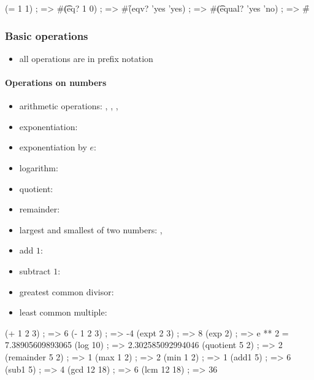 \documentclass[a4paper,landscape,10pt]{article}
\begin{document}
\begin{multicols*}{2}
  \begin{racket}
(= 1 1) ; => #\t
(eq? 1 0) ; => #\f
(eqv? 'yes 'yes) ; => #\t
(equal? 'yes 'no) ; => #\f
\end{racket}

  \subsubsection{Basic operations}

  \begin{itemize}
    \item all operations are in prefix notation 
  \end{itemize}

  \breakcolumn

  \paragraph{Operations on numbers}

  \begin{itemize}
    \item arithmetic operations: \iracket{+}, \iracket{-}, \iracket{*}, \iracket{/}
    \item exponentiation: 
    \item exponentiation by \(e\): 
    \item logarithm: 
    \item quotient: 
    \item remainder: 
    \item largest and smallest of two numbers: , 
    \item add \(1\): 
    \item subtract \(1\): 
    \item greatest common divisor: 
    \item least common multiple: 
  \end{itemize}

  \begin{racket}
(+ 1 2 3) ; => 6
(- 1 2 3) ; => -4
(expt 2 3) ; => 8
(exp 2) ; => e ** 2 = 7.38905609893065
(log 10) ; => 2.302585092994046
(quotient 5 2) ; => 2
(remainder 5 2) ; => 1
(max 1 2) ; => 2
(min 1 2) ; => 1
(add1 5) ; => 6
(sub1 5) ; => 4
(gcd 12 18) ; => 6
(lcm 12 18) ; => 36
\end{racket}


\end{multicols*}
\end{document}
